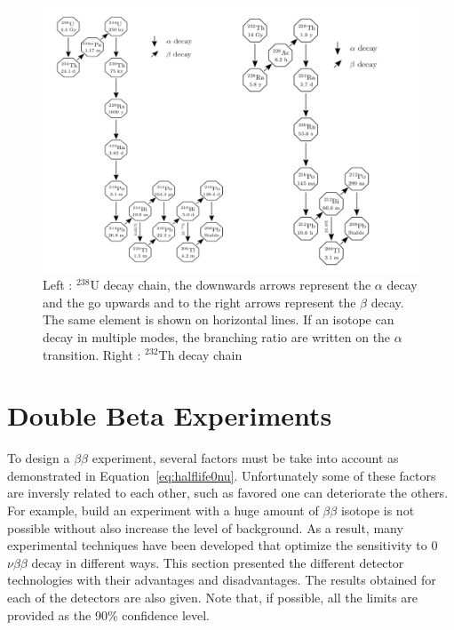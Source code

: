 \documentclass[main.tex]{subfiles}
\begin{document}
\begin{figure}[h!]
\begin{center}
\includegraphics[scale=0.40]{pictures/Chap2/u238-th232decayChain.pdf}
\caption{Left : $^{238}$U decay chain, the downwards arrows represent the $\alpha$ decay and the go upwards and to the right arrows represent the $\beta$ decay. The same element is shown on horizontal lines. If an isotope can decay in multiple modes, the branching ratio are written on the $\alpha$ transition. Right : $^{232}$Th decay chain }
\label{u238-th232decayChain}
\end{center}
\end{figure}


\FloatBarrier


\section{Double Beta Experiments}\label{sec:DBDexperiment}


\NI To design a $\beta\beta$ experiment, several factors must be take into account as demonstrated in Equation~\ref{eq:halflife0nu}. Unfortunately some of these factors are inversly related to each other, such as favored one can deteriorate the others. For example, build an experiment with a huge amount of $\beta\beta$ isotope is not possible without also increase the level of background. As a result, many experimental techniques have been developed that optimize the sensitivity to 0$\nu\beta\beta$ decay in different ways. This section presented the different detector technologies with their advantages and disadvantages. The results obtained for each of the detectors are also given. Note that, if possible, all  the limits are provided as the 90\% confidence level.
\end{document}
